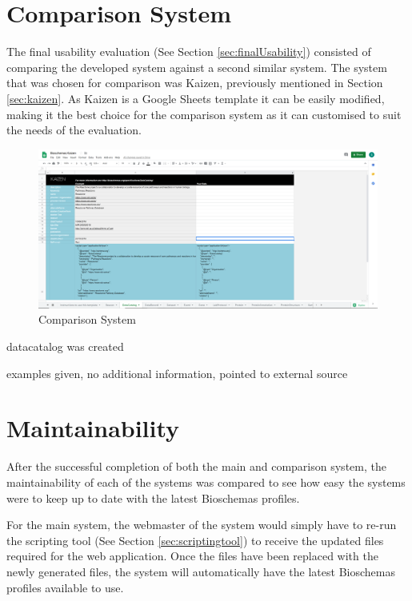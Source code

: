 \newpage
\section{Comparison System}\label{sec:comparisonsystem}
The final usability evaluation (See Section \ref{sec:finalUsability}) consisted of comparing the developed system against a second similar system. The system that was chosen for comparison was Kaizen, previously mentioned in Section \ref{sec:kaizen}. As Kaizen is a Google Sheets template it can be easily modified, making it the best choice for the comparison system as it can customised to suit the needs of the evaluation.




\begin{figure}[!h]
 \centering\includegraphics[scale=0.5]{images/system/BioschemasKaizen.PNG}
   \caption{Comparison System}
   \label{fig:comparisonSystem}
\end{figure}


datacatalog was created

examples given, no additional information, pointed to external source


\newpage
\section{Maintainability}
After the successful completion of both the main and comparison system, the maintainability of each of the systems was compared to see how easy the systems were to keep up to date with the latest Bioschemas profiles.

For the main system, the webmaster of the system would simply have to re-run the scripting tool (See Section \ref{sec:scriptingtool}) to receive the updated files required for the web application. Once the files have been replaced with the newly generated files, the system will automatically have the latest Bioschemas profiles available to use.

